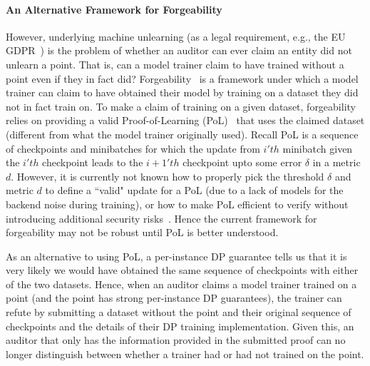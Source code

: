 \paragraph{An Alternative Framework for Forgeability} However, underlying machine unlearning (as a legal requirement, e.g., the EU GDPR~\cite{mantelero2013eu}) is the problem of whether an auditor can ever claim an entity did not unlearn a point. That is, can a model trainer claim to have trained without a point even if they in fact did? Forgeability~\cite{thudi2022necessity} is a framework under which a model trainer can claim to have obtained their model by training on a dataset they did not in fact train on. To make a claim of training on a given dataset, forgeability relies on providing a valid Proof-of-Learning (PoL)~\cite{jia2021proof} that uses the claimed dataset (different from what the model trainer originally used). Recall PoL is a sequence of checkpoints and minibatches for which the update from $i'th$ minibatch given the $i'th$ checkpoint leads to the $i+1'th$ checkpoint upto some error $\delta$ in a metric $d$. However, it is currently not known how to properly pick the threshold $\delta$ and metric $d$ to define a ``valid" update for a PoL (due to a lack of models for the backend noise during training), or how to make PoL efficient to verify without introducing additional security risks~\cite{fang2023proof}. Hence the current framework for forgeability may not be robust until PoL is better understood.

As an alternative to using PoL, a per-instance DP guarantee tells us that it is very likely we would have obtained the same sequence of checkpoints with either of the two datasets. Hence, when an auditor claims a model trainer trained on a point (and the point has strong per-instance DP guarantees), the trainer can refute by submitting a dataset without the point and their original sequence of checkpoints and the details of their DP training implementation. Given this, an 
auditor that only has the information provided in the submitted proof can no longer distinguish between whether a trainer had or had not trained on the point. 






